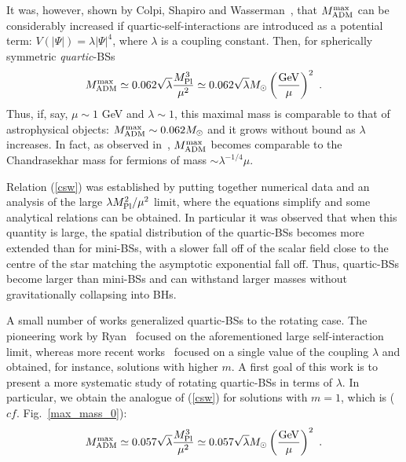 It was, however, shown by Colpi, Shapiro and Wasserman~\cite{Colpi:1986ye}, that $M^{\rm max}_{\rm ADM}$ can be considerably increased if quartic-self-interactions are introduced as a potential term: $V(|\Psi|)=\lambda|\Psi|^4$, where $\lambda$ is a coupling constant. Then, for spherically symmetric \textit{quartic}-BSs~\cite{Colpi:1986ye}
%
\begin{equation}
 M_{\rm ADM}^{\rm max}\simeq 
0.062  \sqrt{\lambda}\frac{M_{\rm Pl}^3}{\mu^2}\simeq 0.062  \sqrt{\lambda}M_\odot \left(\frac{\rm GeV}{\mu}\right)^2\ .
\label{csw}
\end{equation}
Thus, if, say, $\mu\sim 1$ GeV and $\lambda\sim 1$, this maximal mass is comparable to that of astrophysical objects: $M_{\rm ADM}^{\rm max}\sim 0.062 M_\odot$ and it grows without bound as $\lambda$ increases. In fact, as observed in~\cite{Colpi:1986ye}, $M^{\rm max}_{\rm ADM}$ becomes comparable to the Chandrasekhar mass for fermions of mass $\sim\lambda^{-1/4}\mu$.

Relation (\ref{csw}) was established by putting together numerical data and an analysis of the large $\lambda M_{\rm Pl}^2/\mu^2$ limit, where the equations simplify and some analytical relations can be obtained. In particular it was observed that when this quantity is large, the spatial
distribution of the quartic-BSs becomes more extended than for mini-BSs, with a slower fall off of the scalar field close to the centre of the star matching the asymptotic exponential fall off. Thus, quartic-BSs become larger than mini-BSs and can withstand larger masses without gravitationally collapsing into BHs.

A small number of works generalized quartic-BSs to the rotating case. The pioneering work by Ryan~\cite{Ryan:1996nk} focused on the aforementioned large self-interaction limit, whereas more recent works~\cite{Grandclement:2014msa,Kleihaus:2015iea} focused on a single value of the coupling $\lambda$ and obtained, for instance, solutions with higher $m$. A first goal of this work is to present a more
 systematic study of  rotating quartic-BSs in terms of $\lambda$. In particular, we obtain the analogue of (\ref{csw}) for solutions with $m=1$, which is ($cf.$ Fig.~\ref{max_mass_0}):
%
\begin{equation}
M_{\rm ADM}^{\rm max}\simeq 
0.057  \sqrt{\lambda}\frac{M_{\rm Pl}^3}{\mu^2}\simeq 0.057  \sqrt{\lambda}M_\odot \left(\frac{\rm GeV}{\mu}\right)^2\ .
\label{quartic_rotating}
\end{equation}
 
